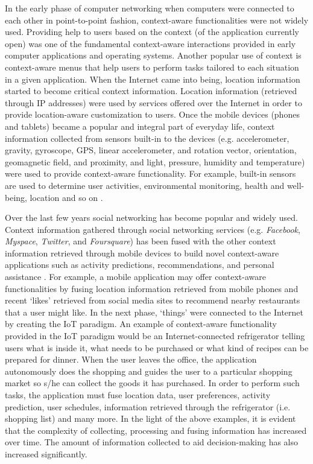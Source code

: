 \documentclass[journal]{IEEEtran}
\begin{document}
In the early phase of computer networking when computers were connected to each other in point-to-point fashion, context-aware functionalities were not widely used. Providing help to users based on the context (of the application currently open) was one of the fundamental context-aware interactions provided in early computer applications and operating systems. Another popular use of context is context-aware menus that help users to perform tasks tailored to each situation in a given application. When the Internet came into being, location information started to become critical context information. Location information (retrieved through IP addresses) were used by services offered over the Internet in order to provide location-aware customization to users. Once the mobile devices (phones and tablets) became a popular and integral part of everyday life, context information collected from sensors built-in to the devices (e.g. accelerometer, gravity, gyroscope, GPS, linear accelerometer, and rotation vector, orientation, geomagnetic field, and proximity, and light, pressure, humidity and temperature) were used to provide context-aware functionality. For example, built-in sensors are used to determine user activities, environmental monitoring, health and well-being, location and so on \cite{P217}. 








Over the last few years social networking \cite{IA01} has become popular and widely used. Context information gathered through social networking services \cite{IA08} (e.g. \textit{Facebook}, \textit{Myspace}, \textit{Twitter}, and \textit{Foursquare}) has been fused with the other context information retrieved through mobile devices to build novel context-aware applications such as activity predictions, recommendations, and personal assistance \cite{NP002}. For example, a mobile application may offer context-aware functionalities by fusing location information retrieved from mobile phones and recent `likes' retrieved from social media sites to recommend nearby restaurants that a user might like. In the next phase, `things' were connected to the Internet by creating the IoT paradigm. An example of context-aware functionality provided in the IoT paradigm would be an Internet-connected refrigerator telling users what is inside it, what needs to be purchased or what kind of recipes can be prepared for dinner. When the user leaves the office, the application autonomously does the shopping and guides the user to a particular shopping market so s/he can collect the goods it has purchased. In order to perform such tasks, the application must fuse location data, user preferences, activity prediction, user schedules, information retrieved through the refrigerator (i.e. shopping list) and many more. In the light of the above examples, it is evident that the complexity of collecting, processing and fusing information has increased over time. The amount of information collected to aid decision-making has also increased significantly. 
\end{document}
